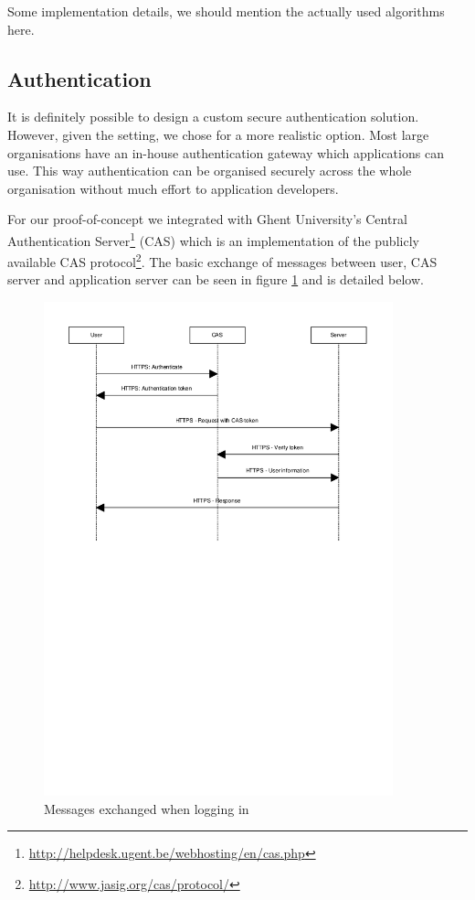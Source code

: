 \documentclass{article}
\begin{document}
Some implementation details, we should mention the actually used algorithms
here.

\subsection{Authentication}
\label{subsec:impl-authentication}

It is definitely possible to design a custom secure authentication solution.
However, given the setting, we chose for a more realistic option. Most large
organisations have an in-house authentication gateway which applications can
use. This way authentication can be organised securely across the whole
organisation without much effort to application developers.

For our proof-of-concept we integrated with Ghent University's Central
Authentication Server\footnote{\url{http://helpdesk.ugent.be/webhosting/en/cas.php}}
(CAS) which is an implementation of the publicly available CAS
protocol\footnote{\url{http://www.jasig.org/cas/protocol/}}. The basic
exchange of messages between user, CAS server and application server can be seen
in figure \ref{fig:login} and is detailed below.

\begin{figure}[ht]
  \begin{center}
  \includegraphics[width=0.9\textwidth]{images/login.pdf}
  \caption{Messages exchanged when logging in}
  \label{fig:login}
  \end{center}
\end{figure}
\end{document}
